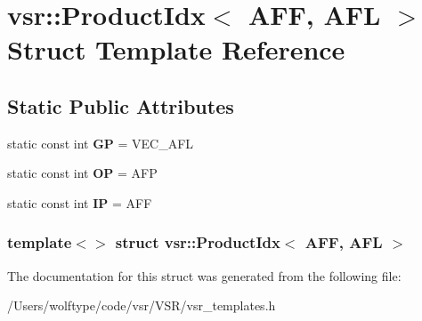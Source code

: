 \hypertarget{structvsr_1_1_product_idx_3_01_a_f_f_00_01_a_f_l_01_4}{\section{vsr\-:\-:Product\-Idx$<$ A\-F\-F, A\-F\-L $>$ Struct Template Reference}
\label{structvsr_1_1_product_idx_3_01_a_f_f_00_01_a_f_l_01_4}
}
\subsection*{Static Public Attributes}
\begin{DoxyCompactItemize}
\item 
\hypertarget{structvsr_1_1_product_idx_3_01_a_f_f_00_01_a_f_l_01_4_a47c9883c2869f1fc2ff1a5e11063be70}{static const int {\bfseries G\-P} = V\-E\-C\-\_\-\-A\-F\-L}\label{structvsr_1_1_product_idx_3_01_a_f_f_00_01_a_f_l_01_4_a47c9883c2869f1fc2ff1a5e11063be70}

\item 
\hypertarget{structvsr_1_1_product_idx_3_01_a_f_f_00_01_a_f_l_01_4_ad27eff44b4912722ecd8ee095b067db7}{static const int {\bfseries O\-P} = A\-F\-P}\label{structvsr_1_1_product_idx_3_01_a_f_f_00_01_a_f_l_01_4_ad27eff44b4912722ecd8ee095b067db7}

\item 
\hypertarget{structvsr_1_1_product_idx_3_01_a_f_f_00_01_a_f_l_01_4_a260832a31529094b74fc44e637ec61c6}{static const int {\bfseries I\-P} = A\-F\-F}\label{structvsr_1_1_product_idx_3_01_a_f_f_00_01_a_f_l_01_4_a260832a31529094b74fc44e637ec61c6}

\end{DoxyCompactItemize}
\subsubsection*{template$<$$>$ struct vsr\-::\-Product\-Idx$<$ A\-F\-F, A\-F\-L $>$}



The documentation for this struct was generated from the following file\-:\begin{DoxyCompactItemize}
\item 
/\-Users/wolftype/code/vsr/\-V\-S\-R/vsr\-\_\-templates.\-h\end{DoxyCompactItemize}

